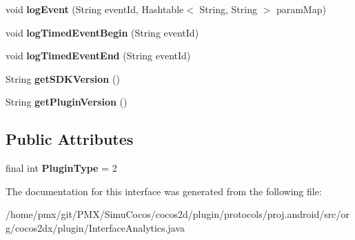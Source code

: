 \begin{DoxyCompactItemize}
void {\bfseries log\+Event} (String event\+Id, Hashtable$<$ String, String $>$ param\+Map)
\item 
\mbox{\label{interfaceorg_1_1cocos2dx_1_1plugin_1_1InterfaceAnalytics_a8c645f339b54f78774f6ae192673c821}} 
void {\bfseries log\+Timed\+Event\+Begin} (String event\+Id)
\item 
\mbox{\label{interfaceorg_1_1cocos2dx_1_1plugin_1_1InterfaceAnalytics_ac1eb7dc2f7a40e962031a6de81731d7c}} 
void {\bfseries log\+Timed\+Event\+End} (String event\+Id)
\item 
\mbox{\label{interfaceorg_1_1cocos2dx_1_1plugin_1_1InterfaceAnalytics_a2792f59da54e782db235e607e7280e39}} 
String {\bfseries get\+S\+D\+K\+Version} ()
\item 
\mbox{\label{interfaceorg_1_1cocos2dx_1_1plugin_1_1InterfaceAnalytics_a5f47cf28e8e1185c533a2871b42848dc}} 
String {\bfseries get\+Plugin\+Version} ()
\end{DoxyCompactItemize}
\subsection*{Public Attributes}
\begin{DoxyCompactItemize}
\item 
\mbox{\label{interfaceorg_1_1cocos2dx_1_1plugin_1_1InterfaceAnalytics_ac5ea5b425f89fd48cb645d23b8342a0a}} 
final int {\bfseries Plugin\+Type} = 2
\end{DoxyCompactItemize}


The documentation for this interface was generated from the following file\+:\begin{DoxyCompactItemize}
\item 
/home/pmx/git/\+P\+M\+X/\+Simu\+Cocos/cocos2d/plugin/protocols/proj.\+android/src/org/cocos2dx/plugin/Interface\+Analytics.\+java\end{DoxyCompactItemize}
